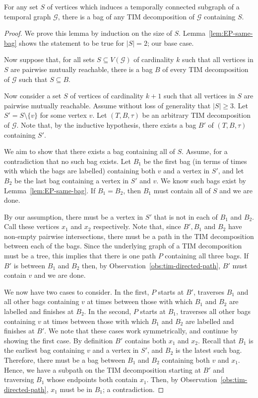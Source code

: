 \documentclass[a4paper,UKenglish,cleveref, autoref, thm-restate]{lipics-v2021} %
\begin{document}
\begin{toappendix}
\begin{lemmarep}\label{lem:EP-part-bag}
    For any set $S$ of vertices which induces a temporally connected subgraph of a temporal graph $\mathcal{G}$, there is a bag of any TIM decomposition of $\mathcal{G}$ containing $S$.
\end{lemmarep}
\begin{proof}
    We prove this lemma by induction on the size of $S$. Lemma~\ref{lem:EP-same-bag} shows the statement to be true for $|S|=2$; our base case. 
    
    Now suppose that, for all sets $S\subseteq V(\mathcal{G})$ of cardinality $k$ such that all vertices in $S$ are pairwise mutually reachable, there is a bag $B$ of every TIM decomposition of $\mathcal{G}$ such that $S\subseteq B$.

    Now consider a set $S$ of vertices of cardinality $k+1$ such that all vertices in $S$ are pairwise mutually reachable. Assume without loss of generality that $|S|\geq 3$. Let $S'=S\setminus \{v\}$ for some vertex $v$. Let $(T,B,\tau)$ be an arbitrary TIM decomposition of $\mathcal{G}$. Note that, by the inductive hypothesis, there exists a bag $B'$ of $(T,B,\tau)$ containing $S'$.

    We aim to show that there exists a bag containing all of $S$. Assume, for a contradiction that no such bag exists. Let $B_1$ be the first bag (in terms of times with which the bags are labelled) containing both $v$ and a vertex in $S'$, and let $B_2$ be the last bag containing a vertex in $S'$ and $v$. We know such bags exist by Lemma~\ref{lem:EP-same-bag}. If $B_1=B_2$, then $B_1$ must contain all of $S$ and we are done.

    By our assumption, there must be a vertex in $S'$ that is not in each of $B_1$ and $B_2$. Call these vertices $x_1$ and $x_2$ respectively. 
    Note that, since $B', B_1$ and $B_2$ have non-empty pairwise intersections, there must be a path in the TIM decomposition between each of the bags. Since the underlying graph of a TIM decomposition must be a tree, this implies that there is one path $P$ containing all three bags. 
    If $B'$ is between $B_1$ and $B_2$ then, by Observation~\ref{obs:tim-directed-path}, $B'$ must contain $v$ and we are done.

    We now have two cases to consider. In the first, $P$ starts at $B'$, traverses $B_1$ and all other bags containing $v$ at times between those with which $B_1$ and $B_2$ are labelled and finishes at $B_2$. In the second, $P$ starts at $B_1$, traverses all other bags containing $v$ at times between those with which $B_1$ and $B_2$ are labelled and finishes at $B'$. We note that these cases work symmetrically, and continue by showing the first case. 
    By definition $B'$ contains both $x_1$ and $x_2$. Recall that $B_1$ is the earliest bag containing $v$ and a vertex in $S'$, and $B_2$ is the latest such bag. Therefore, there must be a bag between $B_1$ and $B_2$ containing both $v$ and $x_1$. Hence, we have a subpath on the TIM decomposition starting at $B'$ and traversing $B_1$ whose endpoints both contain $x_1$. Then, by Observation~\ref{obs:tim-directed-path}, $x_1$ must be in $B_1$; a contradiction.
    

\end{proof}
\end{toappendix}
\end{document}
